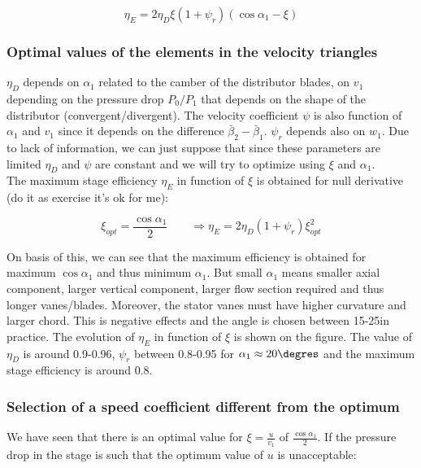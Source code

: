 \begin{equation}
\eta _E = 2\eta _D \xi (1+\psi _r) \left( \cos \alpha _1 - \xi\right)
\end{equation} 

\subsubsection{Optimal values of the elements in the velocity triangles}
$\eta _D$ depends on $\alpha _1$ related to the camber of the distributor blades, on $v_1$ depending on the pressure drop $P_0/P_1$ that depends on the shape of the distributor (convergent/divergent). The velocity coefficient $\psi$ is also function of $\alpha _1$ and $v_1$ since it depends on the difference $\bar{\beta} _2 - \bar{\beta} _1$. $\psi _r$ depends also on $w_1$. Due to lack of information, we can just suppose that since these parameters are limited $\eta _D$ and $\psi$ are constant and we will try to optimize using $\xi$ and $\alpha _1$. \\

The maximum stage efficiency $\eta _E$ in function of $\xi$ is obtained for null derivative (do it as exercise it's ok for me): 

\begin{equation}
\xi _{opt} = \frac{\cos \alpha _1}{2} \qquad \Rightarrow \eta _E = 2\eta _D (1+\psi _r) \xi _{opt}^2
\end{equation} 

On basis of this, we can see that the maximum efficiency is obtained for maximum $\cos \alpha _1$ and thus minimum $\alpha _1$. But small $\alpha _1$ means smaller axial component, larger vertical component, larger flow section required and thus longer vanes/blades. Moreover, the stator vanes must have higher curvature and larger chord. This is negative effects and the angle is chosen between 15-25\degres in practice. The evolution of $\eta _E$ in function of $\xi$ is shown on the figure. The value of $\eta _D$ is around 0.9-0.96, $\psi _r$ between 0.8-0.95 for $\alpha _1 \approx 20\degres$ and the maximum stage efficiency is around 0.8.

\subsubsection{Selection of a speed coefficient different from the optimum}
We have seen that there is an optimal value for $\xi = \frac{u}{v_1}$ of $\frac{\cos \alpha _1}{2}$. If the pressure drop in the stage is such that the optimum value of $u$ is unacceptable: 

